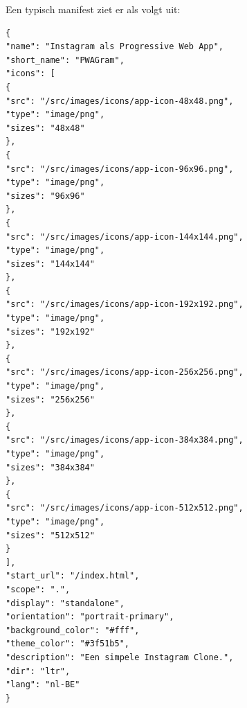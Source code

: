Een typisch manifest ziet er als volgt uit: 
	\begin{lstlisting}
{
"name": "Instagram als Progressive Web App",
"short_name": "PWAGram",
"icons": [
{
"src": "/src/images/icons/app-icon-48x48.png",
"type": "image/png",
"sizes": "48x48"
},
{
"src": "/src/images/icons/app-icon-96x96.png",
"type": "image/png",
"sizes": "96x96"
},
{
"src": "/src/images/icons/app-icon-144x144.png",
"type": "image/png",
"sizes": "144x144"
},
{
"src": "/src/images/icons/app-icon-192x192.png",
"type": "image/png",
"sizes": "192x192"
},
{
"src": "/src/images/icons/app-icon-256x256.png",
"type": "image/png",
"sizes": "256x256"
},
{
"src": "/src/images/icons/app-icon-384x384.png",
"type": "image/png",
"sizes": "384x384"
},
{
"src": "/src/images/icons/app-icon-512x512.png",
"type": "image/png",
"sizes": "512x512"
}
],
"start_url": "/index.html",
"scope": ".",
"display": "standalone",
"orientation": "portrait-primary",
"background_color": "#fff",
"theme_color": "#3f51b5",
"description": "Een simpele Instagram Clone.",
"dir": "ltr",
"lang": "nl-BE"
}
\end{lstlisting}


